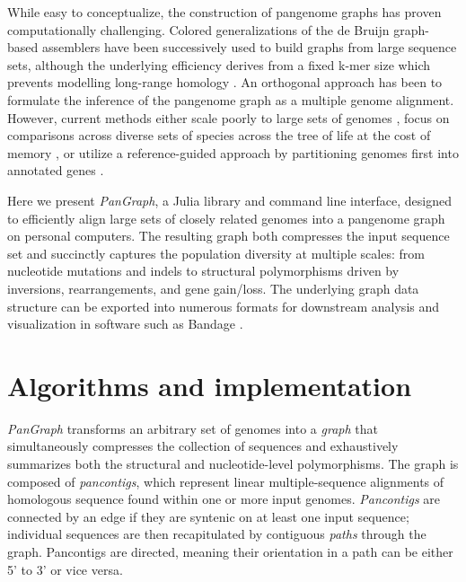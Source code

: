 \documentclass[aps,rmp,reprint,superscriptaddress,notitlepage,10pt]{revtex4-1}
\begin{document}
While easy to conceptualize, the construction of pangenome graphs has proven computationally challenging.
Colored generalizations of the de Bruijn graph-based assemblers have been successively used to build graphs from large sequence sets, although the underlying efficiency derives from a fixed k-mer size which prevents modelling long-range homology \cite{iqbal2012novo,muggli2017succinct}.
An orthogonal approach has been to formulate the inference of the pangenome graph as a multiple genome alignment.
However, current methods either scale poorly to large sets of genomes \cite{darling2010progressivemauve}, focus on comparisons across diverse sets of species across the tree of life at the cost of memory \cite{armstrong2020progressive}, or utilize a reference-guided approach by partitioning genomes first into annotated genes \cite{gautreau2020ppanggolin,colquhoun2021pandora}.

Here we present \emph{PanGraph}, a Julia \cite{bezanson2017julia} library and command line interface, designed to efficiently align large sets of closely related genomes into a pangenome graph on personal computers.
The resulting graph both compresses the input sequence set and succinctly captures the population diversity at multiple scales: from nucleotide mutations and indels to structural polymorphisms driven by inversions, rearrangements, and gene gain/loss.
The underlying graph data structure can be exported into numerous formats for downstream analysis and visualization in software such as Bandage \cite{wick2015bandage}.

\section{Algorithms and implementation}
\emph{PanGraph} transforms an arbitrary set of genomes into a \emph{graph} that simultaneously compresses the collection of sequences and exhaustively summarizes both the structural and nucleotide-level polymorphisms.
The graph is composed of \emph{pancontigs}, which represent linear multiple-sequence alignments of homologous sequence found within one or more input genomes.
\emph{Pancontigs} are connected by an edge if they are syntenic on at least one input sequence; individual sequences are then recapitulated by contiguous \emph{paths} through the graph.
Pancontigs are directed, meaning their orientation in a path can be either 5' to 3' or vice versa.
\end{document}
